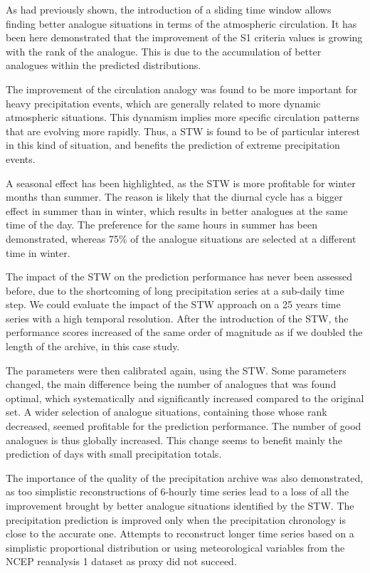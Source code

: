 \documentclass[hess]{copernicus}
\begin{document}
As \citet{Finet2008} had previously shown, the introduction of a sliding time window allows finding better analogue situations in terms of the atmospheric circulation. It has been here demonstrated that the improvement of the S1 criteria values is growing with the rank of the analogue. This is due to the accumulation of better analogues within the predicted distributions.

The improvement of the circulation analogy was found to be more important for heavy precipitation events, which are generally related to more dynamic atmospheric situations. This dynamism implies more specific circulation patterns that are evolving more rapidly. Thus, a STW is found to be of particular interest in this kind of situation, and benefits the prediction of extreme precipitation events.

A seasonal effect has been highlighted, as the STW is more profitable for winter months than summer. The reason is likely that the diurnal cycle has a bigger effect in summer than in winter, which results in better analogues at the same time of the day. The preference for the same hours in summer has been demonstrated, whereas 75\% of the analogue situations are selected at a different time in winter.

The impact of the STW on the prediction performance has never been assessed before, due to the shortcoming of long precipitation series at a sub-daily time step. We could evaluate the impact of the STW approach on a 25 years time series with a high temporal resolution. After the introduction of the STW, the performance scores increased of the same order of magnitude as if we doubled the length of the archive, in this case study.

The parameters were then calibrated again, using the STW. Some parameters changed, the main difference being the number of analogues that was found optimal, which systematically and significantly increased compared to the original set. A wider selection of analogue situations, containing those whose rank decreased, seemed profitable for the prediction performance. The number of good analogues is thus globally increased. This change seems to benefit mainly the prediction of days with small precipitation totals.

The importance of the quality of the precipitation archive was also demonstrated, as too simplistic reconstructions of 6-hourly time series lead to a loss of all the improvement brought by better analogue situations identified by the STW. The precipitation prediction is improved only when the precipitation chronology is close to the accurate one. Attempts to reconstruct longer time series based on a simplistic proportional distribution or using meteorological variables from the NCEP reanalysis 1 dataset as proxy did not succeed.
\end{document}

